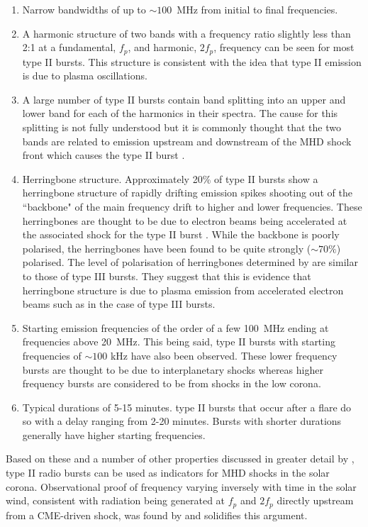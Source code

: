 \begin{enumerate}
    \item Narrow bandwidths of up to $\sim 100$~MHz from initial to final frequencies.
    \item A harmonic structure of two bands with a frequency ratio slightly less than 2:1 at a fundamental, $f_p$, and harmonic, $2f_p$, frequency can be seen for most type II bursts. This structure is consistent with the idea that type II emission is due to plasma oscillations.
    \item A large number of type II bursts contain band splitting into an upper and lower band for each of the harmonics in their spectra. The cause for this splitting is not fully understood but it is commonly thought that the two bands are related to emission upstream and downstream of the MHD shock front which causes the type II burst \citep{Smerd1974,NelsonandMelrose1985, Vrsnak2002}.
    \item Herringbone structure. Approximately 20\% of type II bursts show a herringbone structure of rapidly drifting emission spikes shooting out of the ``backbone" of the main frequency drift to higher and lower frequencies. These herringbones are thought to be due to electron beams being accelerated at the associated shock for the type II burst \citep{Mann1995}. While the backbone is poorly polarised, the herringbones have been found to be quite strongly ($\sim 70\%$) polarised. The level of polarisation of herringbones determined by \cite{Suzuki1980} are similar to those of type III bursts. They suggest that this is evidence that herringbone structure is due to plasma emission from accelerated electron beams such as in the case of type III bursts. 
    \item Starting emission frequencies of the order of a few 100~MHz ending at frequencies above 20~MHz. This being said, type II bursts with starting frequencies of $\sim 100$ kHz have also been observed. 
    These lower frequency bursts are thought to be due to interplanetary shocks whereas higher frequency bursts are considered to be from shocks in the low corona.
    \item Typical durations of 5-15 minutes. type II bursts that occur after a flare do so with a delay ranging from 2-20 minutes. Bursts with shorter durations generally have higher starting frequencies. %
\end{enumerate}
 
Based on these and a number of other properties discussed in greater detail by \cite{NelsonandMelrose1985}, type II radio bursts can be used as indicators for MHD shocks in the solar corona. Observational proof of frequency varying inversely with time in the solar wind, consistent with radiation being generated at $f_p$ and $2f_p$ directly upstream from a CME-driven shock, was found by \cite{Reiner1997} and solidifies this argument.
